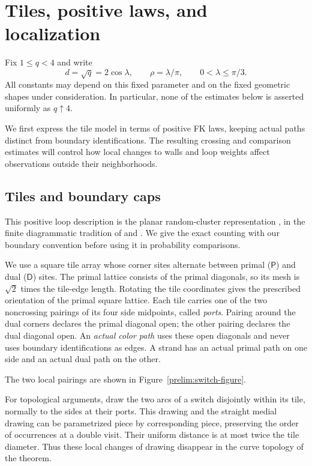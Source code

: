 \section{Tiles, positive laws, and localization}\label{sec:preliminaries}

Fix $1\le q<4$ and write
\begin{equation}\label{prelim:parameters}
 d=\sqrt q=2\cos\lambda,\qquad \rho=\lambda/\pi,
 \qquad 0<\lambda\le\pi/3.
\end{equation}
All constants may depend on this fixed parameter and on the fixed geometric
shapes under consideration. In particular, none of the estimates below is
asserted uniformly as $q\uparrow4$.

We first express the tile model in terms of positive FK laws, keeping
actual paths distinct from boundary identifications.  The resulting
crossing and comparison estimates will control how local changes to
walls and loop weights affect observations outside their neighborhoods.

\subsection{Tiles and boundary caps}

This positive loop description is the planar random-cluster
representation \citep{FortuinKasteleyn1972}, in the finite diagrammatic
tradition of \citet{TemperleyLieb1971} and \citet{BaxterKellandWu1976}.
We give the exact counting with our boundary convention before using
it in probability comparisons.

We use a square tile array whose corner sites alternate between primal
($\mathsf P$) and dual ($\mathsf D$) sites. The primal lattice consists of the
primal diagonals, so its mesh is $\sqrt2$ times the tile-edge length. Rotating
the tile coordinates gives the prescribed orientation of the primal square
lattice. Each tile carries one of the two noncrossing pairings of its four
side midpoints, called \emph{ports}. Pairing around the dual corners declares
the primal diagonal open; the other pairing declares the dual diagonal open.
An \emph{actual color path} uses these open diagonals and never uses boundary
identifications as edges. A strand has an actual primal path on one side and
an actual dual path on the other.

The two local pairings are shown in Figure~\ref{prelim:switch-figure}.



For topological arguments, draw the two arcs of a switch disjointly within
its tile, normally to the sides at their ports. This drawing and the straight
medial drawing can be parametrized piece by corresponding piece, preserving
the order of occurrences at a double visit. Their uniform distance is at
most twice the tile diameter. Thus these local changes of drawing disappear
in the curve topology of the theorem.

